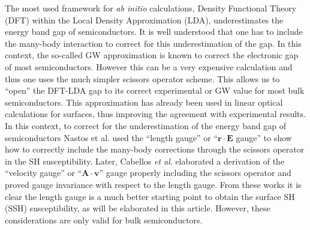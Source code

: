 \documentclass[floatfix,prb,aps,superscriptaddress,showpacs,11pt,preprint,letterpaper]{revtex4}
\def\chon{red}
\begin{document}
The most used framework for \textit{ab initio} calculations, Density 
Functional Theory (DFT) within the Local Density Approximation (LDA),
\cite{kohnPR65} underestimates the energy band gap of semiconductors. It is 
well understood that one has to include the many-body interaction to correct 
for this underestimation of the gap. In this context, the so-called GW 
approximation\cite{onidaRMP02} is known to correct the electronic gap of most 
semiconductors\cite{luceroJPCM12}. However this can be a very expensive
calculation and thus one uses the much simpler scissors operator scheme.
\cite{levinePRL89,levinePRL91,delsolePRB93}  
{\color{\chon}This allows us to ``open'' the DFT-LDA gap to 
its correct experimental or GW value for most bulk semiconductors.
This approximation has already been used in linear optical calculations for 
surfaces,\cite{kippPRL96} thus improving the agreement with 
experimental results.}
In this context, to correct for the underestimation of the energy band gap of 
semiconductors Nastos et al.\cite{nastosPRB05} used the ``length gauge'' or 
``$\mathbf{r}\cdot\mathbf{E}$ gauge'' to show how to correctly include the 
many-body corrections through the scissors operator in the SH susceptibility.
Later, Cabellos \textit{et al}.\cite{cabellosPRB09} elaborated a derivation 
of the ``velocity gauge'' or ``$\mathbf{A}\cdot\mathbf{v}$'' gauge properly including the 
scissors operator and proved gauge invariance with respect to the length 
gauge. From these works it is clear the length gauge is a much better starting
point to obtain the surface SH (SSH) susceptibility, as will be elaborated 
in this article. However, these considerations are only valid for bulk 
semiconductors.
\end{document}
